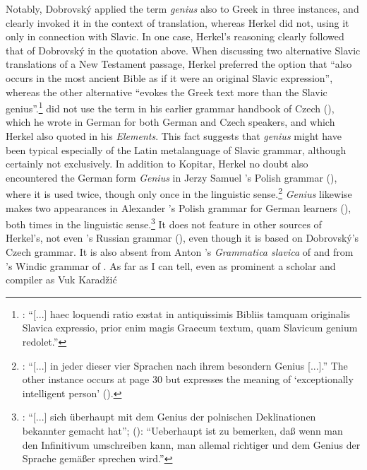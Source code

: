 \noindent Notably, Dobrovský applied the term \textit{genius} also to Greek in three instances, and clearly invoked it in the context of translation, whereas Herkel did not, using it only in connection with Slavic. In one case, Herkel’s reasoning clearly followed that of Dobrovský in the quotation above. When discussing two alternative Slavic translations of a New Testament passage, Herkel preferred the option that “also occurs in the most ancient Bible as if it were an original Slavic expression”, whereas the other alternative “evokes the Greek text more than the Slavic genius”.\footnote{\citet[35]{herkel_elementa_1826}: “[...] haec loquendi ratio exstat in antiquissimis Bibliis tamquam originalis Slavica expressio, prior enim magis Graecum textum, quam Slavicum genium redolet.”} \citeauthor{dobrovsky_ausfuhrliches_1809} did not use the term in his earlier grammar handbook of Czech (\citeyear{dobrovsky_ausfuhrliches_1809}), which he wrote in German for both German and Czech speakers, and which Herkel also quoted in his \textit{Elements}. This fact suggests that \textit{genius} might have been typical especially of the Latin metalanguage of Slavic grammar, although certainly not exclusively. In addition to Kopitar, Herkel no doubt also encountered the German form \textit{Genius} in Jerzy Samuel \citeauthor{bandtkie_polnische_1824}’s Polish grammar (\citeyear{bandtkie_polnische_1824}), where it is used twice, though only once in the linguistic sense.\footnote{\citet[287]{bandtkie_polnische_1824}: “[...] in jeder dieser vier Sprachen nach ihrem besondern Genius [...].” The other instance occurs at page 30 but expresses the meaning of ‘exceptionally intelligent person’ (\citeyear[30]{bandtkie_polnische_1824}).} \textit{Genius} likewise makes two appearances in Alexander \citeauthor{adamowicz_praktische_1796}’s Polish grammar for German learners (\citeyear{adamowicz_praktische_1796}), both times in the linguistic sense.\footnote{\citet[29]{adamowicz_praktische_1796}: “[...] sich überhaupt mit dem Genius der polnischen Deklinationen bekannter gemacht hat”; (\citeyear[161]{adamowicz_praktische_1796}): “Ueberhaupt ist zu bemerken, daß wenn man den Infinitivum umschreiben kann, man allemal richtiger und dem Genius der Sprache gemäßer sprechen wird.”} It does not feature in other sources of Herkel’s, not even \citeauthor{puchmayer_lehrgebaude_1820}’s Russian grammar (\citeyear{puchmayer_lehrgebaude_1820}), even though it is based on Dobrovský’s Czech grammar. It is also absent from Anton \citeauthor{bernolak_grammatica_1790}’s \textit{Grammatica slavica} of \citeyear{bernolak_grammatica_1790} and from \citeauthor{dainko_lehrbuch_1824}’s Windic grammar of \citeyear{dainko_lehrbuch_1824}. As far as I can tell, even as prominent a scholar and compiler as Vuk Karadžić 